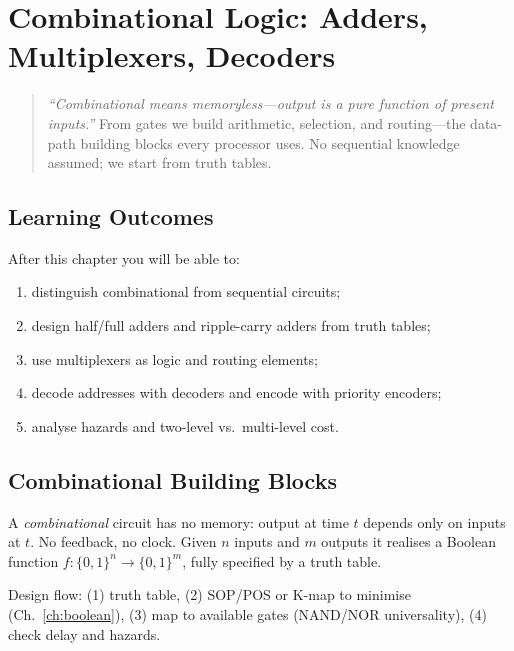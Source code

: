 \chapter{Combinational Logic: Adders, Multiplexers, Decoders}
\label{ch:combinational}

\begin{quote}
\emph{``Combinational means memoryless---output is a pure function of present inputs.''}
From gates we build arithmetic, selection, and routing---the data-path building blocks
every processor uses. No sequential knowledge assumed; we start from truth tables.
\end{quote}

\noindent{}
\vspace{0.4em}

\section*{Learning Outcomes}
After this chapter you will be able to:
\begin{enumerate}[label=(L\arabic*)]
    \item distinguish combinational from sequential circuits;
    \item design half/full adders and ripple-carry adders from truth tables;
    \item use multiplexers as logic and routing elements;
    \item decode addresses with decoders and encode with priority encoders;
    \item analyse hazards and two-level vs.\ multi-level cost.
\end{enumerate}

\section{Combinational Building Blocks}
\label{sec:comb-def}
A \emph{combinational} circuit has no memory: output at time $t$ depends only on inputs at $t$.
No feedback, no clock. Given $n$ inputs and $m$ outputs it realises a Boolean function
$f:\{0,1\}^n\to\{0,1\}^m$, fully specified by a truth table.

Design flow: (1) truth table, (2) SOP/POS or K-map to minimise (Ch.~\ref{ch:boolean}),
(3) map to available gates (NAND/NOR universality), (4) check delay and hazards.

